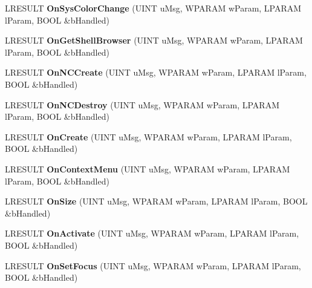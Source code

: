 \begin{DoxyCompactItemize}
L\+R\+E\+S\+U\+LT {\bfseries On\+Sys\+Color\+Change} (U\+I\+NT u\+Msg, W\+P\+A\+R\+AM w\+Param, L\+P\+A\+R\+AM l\+Param, B\+O\+OL \&b\+Handled)
\item 
\mbox{\label{class_c_def_view_ae3d35a699fda14ee5b5c4a6f160c5ef3}} 
L\+R\+E\+S\+U\+LT {\bfseries On\+Get\+Shell\+Browser} (U\+I\+NT u\+Msg, W\+P\+A\+R\+AM w\+Param, L\+P\+A\+R\+AM l\+Param, B\+O\+OL \&b\+Handled)
\item 
\mbox{\label{class_c_def_view_a32bd1a75bcc3e96ed4e8abe7a36a1b94}} 
L\+R\+E\+S\+U\+LT {\bfseries On\+N\+C\+Create} (U\+I\+NT u\+Msg, W\+P\+A\+R\+AM w\+Param, L\+P\+A\+R\+AM l\+Param, B\+O\+OL \&b\+Handled)
\item 
\mbox{\label{class_c_def_view_aae59cfb933ca70c1c474c8c5dfeafc7a}} 
L\+R\+E\+S\+U\+LT {\bfseries On\+N\+C\+Destroy} (U\+I\+NT u\+Msg, W\+P\+A\+R\+AM w\+Param, L\+P\+A\+R\+AM l\+Param, B\+O\+OL \&b\+Handled)
\item 
\mbox{\label{class_c_def_view_af701464fae486aa23adb4f7909a56e15}} 
L\+R\+E\+S\+U\+LT {\bfseries On\+Create} (U\+I\+NT u\+Msg, W\+P\+A\+R\+AM w\+Param, L\+P\+A\+R\+AM l\+Param, B\+O\+OL \&b\+Handled)
\item 
\mbox{\label{class_c_def_view_a1c83093c98915538c55a6a17595a7471}} 
L\+R\+E\+S\+U\+LT {\bfseries On\+Context\+Menu} (U\+I\+NT u\+Msg, W\+P\+A\+R\+AM w\+Param, L\+P\+A\+R\+AM l\+Param, B\+O\+OL \&b\+Handled)
\item 
\mbox{\label{class_c_def_view_a465bebc838f28d20cd36327d061faf07}} 
L\+R\+E\+S\+U\+LT {\bfseries On\+Size} (U\+I\+NT u\+Msg, W\+P\+A\+R\+AM w\+Param, L\+P\+A\+R\+AM l\+Param, B\+O\+OL \&b\+Handled)
\item 
\mbox{\label{class_c_def_view_a8a988abec3a300b0ff2506a30b2a4e6a}} 
L\+R\+E\+S\+U\+LT {\bfseries On\+Activate} (U\+I\+NT u\+Msg, W\+P\+A\+R\+AM w\+Param, L\+P\+A\+R\+AM l\+Param, B\+O\+OL \&b\+Handled)
\item 
\mbox{\label{class_c_def_view_a1370cf6533905253167bd31ad597dbe0}} 
L\+R\+E\+S\+U\+LT {\bfseries On\+Set\+Focus} (U\+I\+NT u\+Msg, W\+P\+A\+R\+AM w\+Param, L\+P\+A\+R\+AM l\+Param, B\+O\+OL \&b\+Handled)

\end{DoxyCompactItemize}
